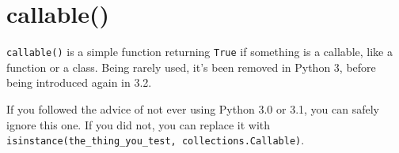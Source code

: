 \section{callable()}

\lstinline{callable()} is a simple function returning \lstinline{True} if something is a \gls{callable}, like a function or a class. Being rarely used, it's been removed in Python 3, before being introduced again in 3.2.

If you followed the advice of not ever using Python 3.0 or 3.1, you can safely ignore this one. If you did not, you can replace it with \lstinline{isinstance(the_thing_you_test, collections.Callable)}.

